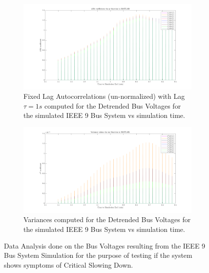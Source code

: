 \begin{figure}[!htpb]
	\begin{subfigure}{\textwidth}
		\centering
		\includegraphics[scale=0.25]{../figures/analysis_matlab/ar1_run02}
		\caption{Fixed Lag Autocorrelations (un-normalized) with Lag $\tau = 1s$ computed for the Detrended Bus Voltages for the simulated IEEE 9 Bus System vs simulation time.}
	\end{subfigure}
	
	\begin{subfigure}{\textwidth}
		\centering
		\includegraphics[scale=0.25]{../figures/analysis_matlab/var_run02}
		\caption{Variances computed for the Detrended Bus Voltages for the simulated IEEE 9 Bus System vs simulation time.}
	\end{subfigure}
	
	\caption{Data Analysis done on the Bus Voltages resulting from the IEEE 9 Bus System Simulation for the purpose of testing if the system shows symptoms of Critical Slowing Down.}
	\label{fig:autocorrAndVariance}
\end{figure}

